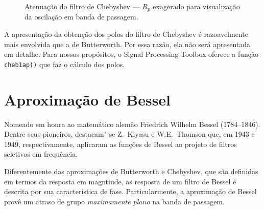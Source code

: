 \begin{figure}[ht]
	\centering
	\caption{Atenuação do filtro de Chebyshev --- $R_p$ exagerado para visualização da oscilação em banda de passagem.}
	\label{fig:achebap}
\end{figure}

A apresentação da obtenção dos polos do filtro de Chebyshev é razoavelmente mais envolvida que a de Butterworth. Por essa razão, ela não será apresentada em detalhe. Para nossos propósitos, o Signal Processing Toolbox oferece a função \lstinline{cheb1ap()} que faz o cálculo dos polos.

\section{Aproximação de Bessel}

Nomeado em honra ao matemático alemão Friedrich Wilhelm Bessel (1784--1846). Dentre seus pioneiros, destacam"-se Z.\ Kiyasu e W.E.\ Thomson que, em 1943 e 1949, respectivamente, aplicaram as funções de Bessel ao projeto de filtros seletivos em frequência.

Diferentemente das aproximações de Butterworth e Chebyshev, que são definidas em termos da resposta em magntiude, as resposta de um filtro de Bessel é descrita por sua característica de fase. Particularmente, a aproximação de Bessel provê um atraso de grupo \emph{maximamente plano} na banda de passagem.

